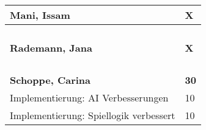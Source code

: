 \documentclass[a4paper,11pt]{scrartcl}
\begin{document}
\begin{longtable}{| p{13.8cm} | C{2.4cm} |}
	\textbf{Mani, Issam} & \textbf{X}\\ %
	\hline


	&

	\\
	\hline


	&

	\\
	\hline


	&

	\\
	\hline


	&

	\\
	\hline
	\hline


	\textbf{Rademann, Jana} & \textbf{X}\\ %
	\hline


	&

	\\
	\hline


	&

	\\
	\hline


	&

	\\
	\hline


	&

	\\
	\hline
	\hline


	\textbf{Schoppe, Carina} & \textbf{30}\\ %
	\hline

  Implementierung: AI Verbesserungen
	&
  10
	\\
	\hline

  Implementierung: Spiellogik verbessert
	&
  10
	\\
	\hline


\end{longtable}
\end{document}

